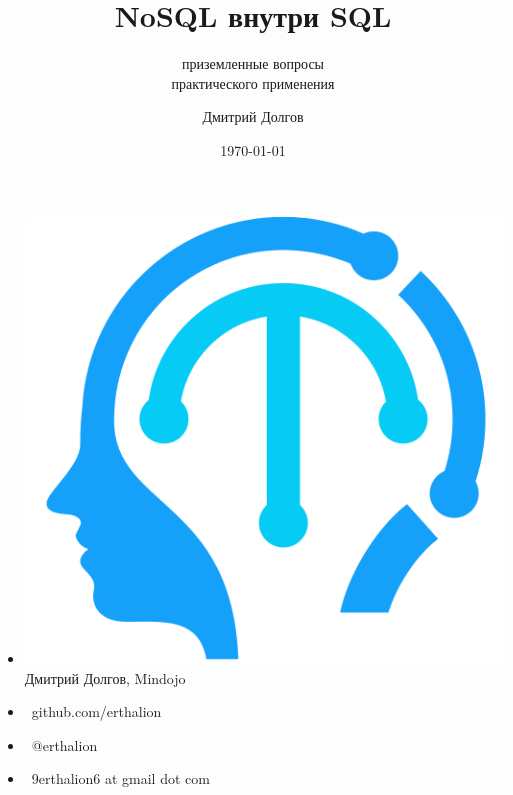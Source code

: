 \documentclass[18pt, compress, aspectratio=169]{beamer}
\title{NoSQL внутри SQL}
\subtitle{приземленные вопросы\\ практического применения}
\date{\today}
\author{Дмитрий Долгов}
\institute{}
\def\twitter{{\FA \faTwitter}}
\def\github{{\FA \faGithubSign}}
\def\email{{\FA \faEnvelope}}
\begin{document}
{
  \fontsize{17pt}{18}\selectfont
  \maketitle
}

\fontsize{21pt}{23}\selectfont
\section{}

\begin{frame}{}
    \begin{itemize}[label={}]
        \item \includegraphics[scale=0.04]{mindojo_logo.png} Дмитрий Долгов, Mindojo
        \item {\github\ github.com/erthalion}
        \item {\twitter\ @erthalion}
        \item \email\ 9erthalion6 at gmail dot com
    \end{itemize}
\end{frame}
\end{document}
